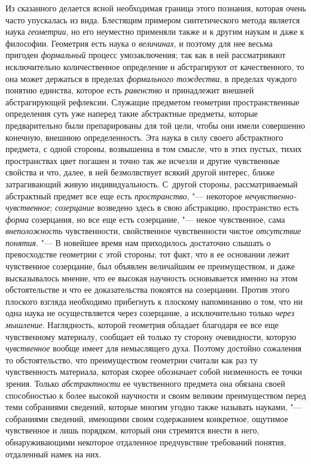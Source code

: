 Из сказанного делается ясной необходимая граница этого
познания, которая очень часто упускалась из вида. Блестящим примером
синтетического метода является наука
{\em геометрии}, но его
неуместно применяли также и к другим наукам и даже к философии. Геометрия
есть наука о {\em величинах},
и поэтому для нее весьма пригоден
{\em формальный} процесс
умозаключения; так как в ней рассматривают исключительно
количественное определение и абстрагируют от качественного, то она может
держаться в пределах {\em формального
тождества}, в пределах чуждого понятию единства, которое
есть {\em равенство} и
принадлежит внешней абстрагирующей рефлексии. Служащие предметом геометрии
пространственные определения суть уже наперед такие абстрактные предметы,
которые предварительно были препарированы для той цели, чтобы они имели
совершенно конечную, внешнюю определенность. Эта наука в силу своего
абстрактного предмета, с одной стороны, возвышенна в том смысле, что в этих
пустых, тихих пространствах цвет погашен и точно так же исчезли и другие
чувственные свойства и что, далее, в ней безмолвствует всякий другой
интерес, ближе затрагивающий живую индивидуальность. С~другой стороны,
рассматриваемый абстрактный предмет все еще есть
{\em пространство}, "---
некоторое
{\em нечувственно-чувственное};
{\em созерцание} возведено
здесь в свою абстракцию, пространство есть
{\em форма} созерцания,
но все еще есть созерцание, "--- некое чувственное, сама
{\em внеположность}
чувственности, свойственное чувственности чистое
{\em отсутствие понятия}. "---
В новейшее время нам приходилось достаточно слышать о
превосходстве геометрии с этой стороны; тот факт, что в ее основании лежит
чувственное созерцание, был объявлен величайшим ее преимуществом, и даже
высказывалось мнение, что ее высокая научность основывается именно на этом
обстоятельстве и что ее доказательства покоятся на
созерцании.
Против этого плоского взгляда необходимо прибегнуть к
плоскому напоминанию о том, что ни одна наука не осуществляется через
созерцание, а исключительно только
{\em через мышление}.
Наглядность, которой геометрия обладает благодаря ее все еще
чувственному материалу, сообщает ей только ту сторону очевидности, которую
{\em чувственное} вообще
имеет для немыслящего духа. Поэтому достойно сожаления то обстоятельство,
что преимуществом геометрии считали как раз ту чувственность материала,
которая скорее обозначает собой низменность ее точки зрения. Только
{\em абстрактности} ее
чувственного предмета она обязана своей способностью к более высокой
научности и своим великим преимуществом перед теми собраниями сведений,
которые многим угодно также называть науками, "--- собраниями
сведений, имеющими своим содержанием конкретное, ощутимое чувственное и
лишь порядком, который они стремятся внести в него, обнаруживающими
некоторое отдаленное предчувствие требований понятия, отдаленный намек на
них.

